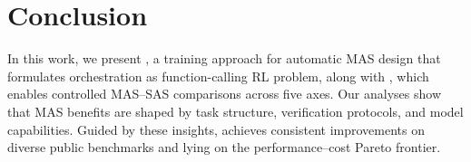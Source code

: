 \section{Conclusion}

In this work, we present \ourframework, a training approach for automatic MAS design that formulates orchestration as function-calling RL problem, along with \ourbenchmark, which enables controlled MAS–SAS comparisons across five axes. Our analyses show that MAS benefits are shaped by task structure, verification protocols, and model capabilities. Guided by these insights, \ourframework achieves consistent improvements on diverse public benchmarks and lying on the performance–cost Pareto frontier.




